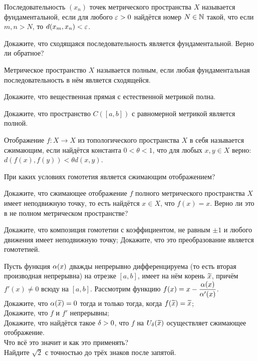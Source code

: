 \documentclass[a4paper,12pt]{article}
\begin{document}

Последовательность $(x_n)$ точек метрического пространства $X$ называется  фундаментальной, если для любого $\varepsilon>0$ найдётся номер $N\in\mathbb{N}$ такой, что если $m,n>N$, то $d(x_m,x_n)<\varepsilon$.

Докажите, что сходящаяся последовательность является фундаментальной.
Верно ли обратное?


Метрическое пространство $X$ называется  полным, если любая фундаментальная последовательность в нём является сходящейся.

Докажите, что вещественная прямая с естественной метрикой полна.

Докажите, что пространство $C([a,b])$ с равномерной метрикой является полной.

Отображение $f\colon X \to X$ из топологического пространства $X$ в себя называется  сжимающим, если найдётся константа $0<\theta<1$, что для любых $x,y\in X$ верно: $d(f(x),f(y))<\theta d(x,y)$.

При каких условиях гомотетия является сжимающим отображением?

Докажите, что сжимающее отображение $f$ полного метрического пространства $X$ имеет неподвижную точку, то есть найдётся $x\in X$, что $f(x)=x$.
Верно ли это в не полном метрическом пространстве?
{}

Докажите, что композиция гомотетии с коэффициентом, не равным $\pm 1$ и любого движения имеет неподвижную точку;
Докажите, что это преобразование является гомотетией.

Пусть функция $\alpha(x)$ дважды непрерывно дифференцируема (то есть вторая производная непрерывна) на отрезке $[a,b]$, имеет на нём корень $\widetilde{x}$, причём $f'(x)\ne0$ всюду на $[a,b]$.
Рассмотрим функцию $f(x) =  x - \dfrac{\alpha(x)}{\alpha'(x)}$.\\
Докажите, что $\alpha(\widetilde{x}) = 0$ тогда и только тогда, когда $f(\widetilde{x})=\widetilde{x}$;\\
Докажите, что $f$ и $f'$ непрерывны;\\
Докажите, что найдётся такое $\delta>0$, что $f$ на $U_\delta(\widetilde{x})$ осуществляет сжимающее отображение.\\
Что всё это значит и как это применять?\\
Найдите $\sqrt{2}$ с точностью до трёх знаков после запятой.

\end{document}
